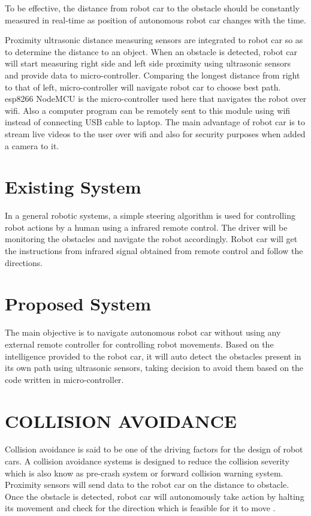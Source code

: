 \documentclass[sigconf]{acmart}
\begin{document}
To be effective, the distance from robot car to the obstacle should be constantly measured in real-time as position of autonomous robot car changes with the time.

Proximity ultrasonic distance measuring sensors are integrated to robot car so as to determine the distance to an object. When an obstacle is detected, robot car will start measuring right side and left side proximity using ultrasonic sensors and provide data to micro-controller. Comparing the longest distance from right to that of left, micro-controller will navigate robot car to choose best path. esp8266 NodeMCU is the micro-controller used here that navigates the robot over wifi. Also a computer program can be remotely sent to this module using wifi instead of connecting USB cable to laptop. The main advantage of robot car is to stream live videos to the user over wifi and also for security purposes when added a camera to it.

\section{Existing System}
In a general robotic systems, a simple steering algorithm is used for controlling robot actions by a human using a infrared remote control. The driver will be monitoring the obstacles and navigate the robot accordingly. Robot car will get the instructions from infrared signal obtained from remote control and follow the directions.

\section{Proposed System}
The main objective is to navigate autonomous robot car without using any external remote controller for controlling robot movements. Based on the intelligence provided to the robot car, it will auto detect the obstacles present in its own path using ultrasonic sensors, taking decision to avoid them based on the code written in micro-controller.

\section{COLLISION AVOIDANCE}
Collision avoidance is said to be one of the driving factors for the design of robot cars. A collision avoidance systems is designed to reduce the collision severity which is also know as pre-crash system or forward collision warning system. Proximity sensors will send data to the robot car on the distance to obstacle. Once the obstacle is detected, robot  car will autonomously take action by halting its movement and check for the direction which is feasible for it to move \cite{stratis2009}. 
\end{document}
